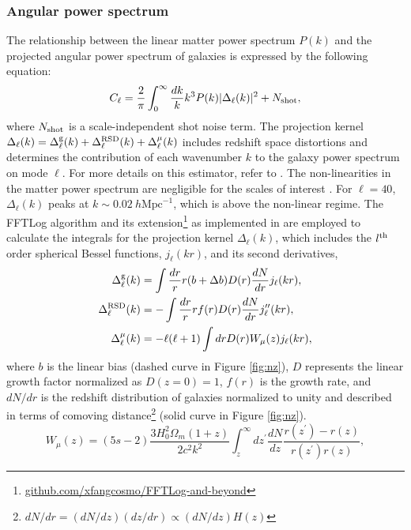 \subsubsection{Angular power spectrum} 
The relationship between the linear matter power spectrum $P(k)$ and the projected angular power spectrum of galaxies is expressed by the following equation:
\begin{equation}\label{eq:cell}
C_{\ell} = \frac{2}{\pi}\int_{0}^{\infty}\frac{dk}{k}k^{3}P(k)|\Delta_{\ell}(k)|^{2} + N_{\rm shot},
\end{equation}
where $N_{\rm shot}$ is a scale-independent shot noise term. The projection kernel $\Delta_{\ell}(k) = \Delta^{\rm g}_{\ell}(k) + \Delta^{\rm RSD}_{\ell}(k) + \Delta^{\mu}_{\ell}(k)$ includes redshift space distortions  and determines the contribution of each wavenumber $k$ to the galaxy power spectrum on mode $\ell$. For more details on this estimator, refer to \cite{Padmanabhan2007}. The non-linearities in the matter power spectrum are negligible for the scales of interest \citep[see, e.g.,][]{Ho2015JCAP...05..040H}. For $\ell=40$, $\Delta_{\ell}(k)$ peaks at $k\sim 0.02~ h\text{Mpc}^{-1}$, which is above the non-linear regime. The FFTLog algorithm and its extension\footnote{\href{https://github.com/xfangcosmo/FFTLog-and-beyond}{github.com/xfangcosmo/FFTLog-and-beyond}} as implemented in \cite{fang2020beyond} are employed to calculate the integrals for the projection kernel $\Delta_{\ell}(k)$, which includes the $l^{\rm th}$ order spherical Bessel functions, $ j_{\ell}(kr)$, and its second derivatives,
\begin{align}
    \Delta^{\rm g}_{\ell}(k) &= \int \frac{dr}{r} r (b+\Delta b) D(r) \frac{dN}{dr} j_{\ell}(kr),\\
    \Delta^{\rm RSD}_{\ell}(k) &= - \int \frac{dr}{r} r f(r) D(r) \frac{dN}{dr} j^{\prime\prime}_{\ell}(kr),\\
    \Delta^{\mu}_{\ell}(k) &= - \ell(\ell+1) \int dr D(r) W_{\mu}(z) j_{\ell}(kr),
\end{align}
where $b$ is the linear bias (dashed curve in Figure \ref{fig:nz}), $D$ represents the linear growth factor normalized as $D(z=0)=1$, $f(r)$ is the growth rate, and $dN/dr$ is the redshift distribution of galaxies normalized to unity and described in terms of comoving distance\footnote{$dN/dr = (dN/dz)(dz/dr) \propto (dN/dz)H(z)$} (solid curve in Figure \ref{fig:nz}). 
\begin{equation}
W_{\mu}(z) = (5s-2)\frac{3H^{2}_{0}\Omega_{m}(1+z)}{2c^{2}k^{2}} \int_{z}^{\infty} dz^{\prime}\frac{dN}{dz} \frac{r(z^{\prime}) - r(z)}{r(z^{\prime})r(z)},
\end{equation}
